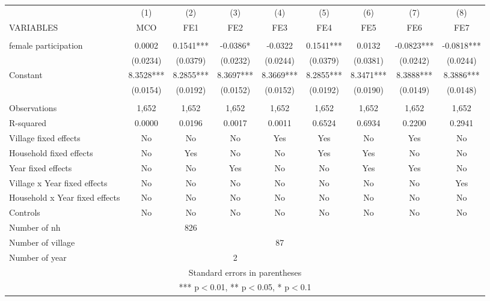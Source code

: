\documentclass[]{article}
\begin{document}
\begin{tabular}{lcccccccc} \hline
 & (1) & (2) & (3) & (4) & (5) & (6) & (7) & (8) \\
VARIABLES & MCO & FE1 & FE2 & FE3 & FE4 & FE5 & FE6 & FE7 \\ \hline
 &  &  &  &  &  &  &  &  \\
female participation & 0.0002 & 0.1541*** & -0.0386* & -0.0322 & 0.1541*** & 0.0132 & -0.0823*** & -0.0818*** \\
 & (0.0234) & (0.0379) & (0.0232) & (0.0244) & (0.0379) & (0.0381) & (0.0242) & (0.0244) \\
Constant & 8.3528*** & 8.2855*** & 8.3697*** & 8.3669*** & 8.2855*** & 8.3471*** & 8.3888*** & 8.3886*** \\
 & (0.0154) & (0.0192) & (0.0152) & (0.0152) & (0.0192) & (0.0190) & (0.0149) & (0.0148) \\
 &  &  &  &  &  &  &  &  \\
Observations & 1,652 & 1,652 & 1,652 & 1,652 & 1,652 & 1,652 & 1,652 & 1,652 \\
R-squared & 0.0000 & 0.0196 & 0.0017 & 0.0011 & 0.6524 & 0.6934 & 0.2200 & 0.2941 \\
Village fixed effects & No & No & No & Yes & Yes & No & Yes & No \\
Household fixed effects & No & Yes & No & No & Yes & Yes & No & No \\
Year fixed effects & No & No & Yes & No & No & Yes & Yes & No \\
Village x Year fixed effects & No & No & No & No & No & No & No & Yes \\
Household x Year fixed effects & No & No & No & No & No & No & No & No \\
Controls & No & No & No & No & No & No & No & No \\
Number of nh &  & 826 &  &  &  &  &  &  \\
Number of village &  &  &  & 87 &  &  &  &  \\
 Number of year &  &  & 2 &  &  &  &  &  \\ \hline
\multicolumn{9}{c}{ Standard errors in parentheses} \\
\multicolumn{9}{c}{ *** p$<$0.01, ** p$<$0.05, * p$<$0.1} \\
\end{tabular}
\end{document}
